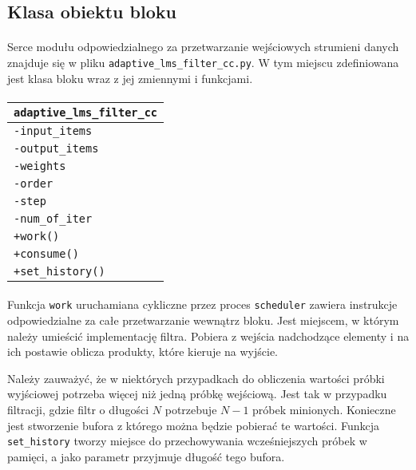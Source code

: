 \subsection{Klasa obiektu bloku}
\paragraph{}
Serce modułu odpowiedzialnego za przetwarzanie wejściowych strumieni danych znajduje się w pliku  \texttt{adaptive\_lms\_filter\_cc.py}. W tym miejscu zdefiniowana jest klasa bloku wraz z jej zmiennymi i funkcjami.

\paragraph{}
\begin{tabular}{|l|} \hline
\texttt{adaptive\_lms\_filter\_cc} \\
\hline
\texttt{-input\_items} \\
\texttt{-output\_items} \\
\texttt{-weights} \\
\texttt{-order} \\
\texttt{-step} \\
\texttt{-num\_of\_iter} \\
\hline
\texttt{+work()} \\
\texttt{+consume()} \\
\texttt{+set\_history()} \\
\hline
\end{tabular}

\paragraph{}
Funkcja \texttt{work} uruchamiana cykliczne przez proces \texttt{scheduler} zawiera instrukcje odpowiedzialne za całe przetwarzanie wewnątrz bloku. 
Jest miejscem, w którym należy umieścić implementację filtra. 
Pobiera z wejścia nadchodzące elementy i na ich postawie oblicza produkty, które kieruje na wyjście.

Należy zauważyć, że w niektórych przypadkach do obliczenia wartości próbki wyjściowej potrzeba więcej niż jedną próbkę wejściową. 
Jest tak w przypadku filtracji, gdzie filtr o długości $N$ potrzebuje $N-1$ próbek minionych. 
Konieczne jest stworzenie bufora z którego można będzie pobierać te wartości. 
Funkcja \texttt{set\_history} tworzy miejsce do przechowywania wcześniejszych próbek w pamięci, a jako parametr przyjmuje długość tego bufora.

